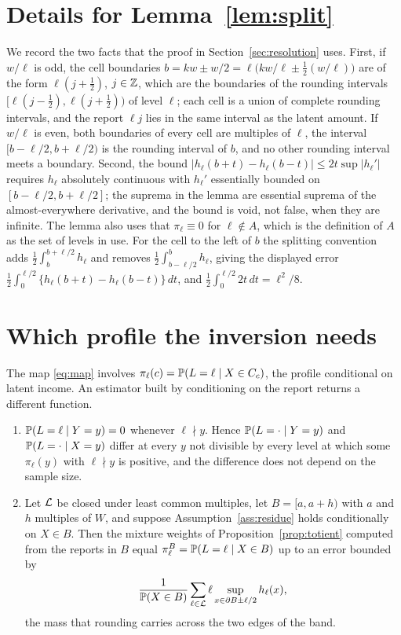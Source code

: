 \section{Details for Lemma~\ref{lem:split}}\label{supp:split}

We record the two facts that the proof in Section~\ref{sec:resolution} uses. First, if $w/\ell$ is odd, the cell boundaries $b=kw\pm w/2=\ell\bigl(kw/\ell\pm\tfrac12(w/\ell)\bigr)$ are of the form $\ell(j+\tfrac12)$, $j\in\mathbb{Z}$, which are the boundaries of the rounding intervals $[\ell(j-\tfrac12),\ell(j+\tfrac12))$ of level $\ell$; each cell is a union of complete rounding intervals, and the report $\ell j$ lies in the same interval as the latent amount. If $w/\ell$ is even, both boundaries of every cell are multiples of $\ell$, the interval $[b-\ell/2,b+\ell/2)$ is the rounding interval of $b$, and no other rounding interval meets a boundary. Second, the bound $|h_\ell(b+t)-h_\ell(b-t)|\le2t\sup|h_\ell'|$ requires $h_\ell$ absolutely continuous with $h_\ell'$ essentially bounded on $[b-\ell/2,b+\ell/2]$; the suprema in the lemma are essential suprema of the almost-everywhere derivative, and the bound is void, not false, when they are infinite. The lemma also uses that $\pi_\ell\equiv0$ for $\ell\notin A$, which is the definition of $A$ as the set of levels in use. For the cell to the left of $b$ the splitting convention adds $\tfrac12\int_b^{b+\ell/2}h_\ell$ and removes $\tfrac12\int_{b-\ell/2}^bh_\ell$, giving the displayed error $\tfrac12\int_0^{\ell/2}\{h_\ell(b+t)-h_\ell(b-t)\}\,dt$, and $\tfrac12\int_0^{\ell/2}2t\,dt=\ell^2/8$.

\section{Which profile the inversion needs}\label{supp:band-statement}

The map \eqref{eq:map} involves $\pi_\ell(c)=\mathbb{P}(L=\ell\mid X\in C_c)$, the profile conditional on latent income. An estimator built by conditioning on the report returns a different function.

\begin{proposition}\label{prop:band}
\begin{enumerate}
\item[(a)] $\mathbb{P}(L=\ell\mid Y=y)=0$ whenever $\ell\nmid y$. Hence $\mathbb{P}(L=\cdot\mid Y=y)$ and $\mathbb{P}(L=\cdot\mid X=y)$ differ at every $y$ not divisible by every level at which some $\pi_\ell(y)$ with $\ell\nmid y$ is positive, and the difference does not depend on the sample size.
\item[(b)] Let $\mathcal{L}$ be closed under least common multiples, let $B=[a,a+h)$ with $a$ and $h$ multiples of $W$, and suppose Assumption~\ref{ass:residue} holds conditionally on $X\in B$. Then the mixture weights of Proposition~\ref{prop:totient} computed from the reports in $B$ equal $\pi_\ell^B=\mathbb{P}(L=\ell\mid X\in B)$ up to an error bounded by
\[
\frac{1}{\mathbb{P}(X\in B)}\sum_{\ell\in\mathcal{L}}\ell\sup_{x\in\partial B\pm\ell/2}h_\ell(x),
\]
the mass that rounding carries across the two edges of the band.
\end{enumerate}
\end{proposition}

